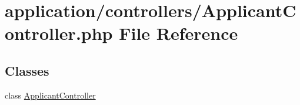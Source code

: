 \hypertarget{_applicant_controller_8php}{\section{application/controllers/\-Applicant\-Controller.php File Reference}
\label{_applicant_controller_8php}
}
\subsection*{Classes}
\begin{DoxyCompactItemize}
\item 
class \hyperlink{class_applicant_controller}{Applicant\-Controller}
\end{DoxyCompactItemize}
